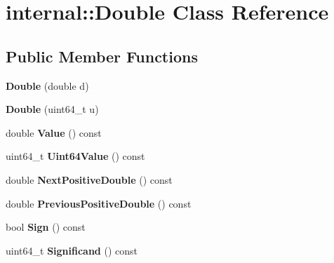 \hypertarget{classinternal_1_1_double}{}\section{internal\+:\+:Double Class Reference}
\label{classinternal_1_1_double}
\subsection*{Public Member Functions}
\begin{DoxyCompactItemize}
\item 
\hypertarget{classinternal_1_1_double_ad66f3b914570ce62e9f16083117f3e4f}{}{\bfseries Double} (double d)\label{classinternal_1_1_double_ad66f3b914570ce62e9f16083117f3e4f}

\item 
\hypertarget{classinternal_1_1_double_a293a7ca841d847ea3e83ffa28b68601f}{}{\bfseries Double} (uint64\+\_\+t u)\label{classinternal_1_1_double_a293a7ca841d847ea3e83ffa28b68601f}

\item 
\hypertarget{classinternal_1_1_double_af35ab8a9e1ee41b1fd8a97d5899cfa1d}{}double {\bfseries Value} () const \label{classinternal_1_1_double_af35ab8a9e1ee41b1fd8a97d5899cfa1d}

\item 
\hypertarget{classinternal_1_1_double_a9b9f08386be36634cc79f2e9427517f9}{}uint64\+\_\+t {\bfseries Uint64\+Value} () const \label{classinternal_1_1_double_a9b9f08386be36634cc79f2e9427517f9}

\item 
\hypertarget{classinternal_1_1_double_a3da449454b6b7e7108ed1b9a00625b68}{}double {\bfseries Next\+Positive\+Double} () const \label{classinternal_1_1_double_a3da449454b6b7e7108ed1b9a00625b68}

\item 
\hypertarget{classinternal_1_1_double_afdb72da520f870534d26c36c2adb3bb5}{}double {\bfseries Previous\+Positive\+Double} () const \label{classinternal_1_1_double_afdb72da520f870534d26c36c2adb3bb5}

\item 
\hypertarget{classinternal_1_1_double_ad3f4421a50d77c3af20638a12ec8f168}{}bool {\bfseries Sign} () const \label{classinternal_1_1_double_ad3f4421a50d77c3af20638a12ec8f168}

\item 
\hypertarget{classinternal_1_1_double_a8c3f5cf8152af8588d32530238c35aad}{}uint64\+\_\+t {\bfseries Significand} () const \label{classinternal_1_1_double_a8c3f5cf8152af8588d32530238c35aad}


\end{DoxyCompactItemize}
